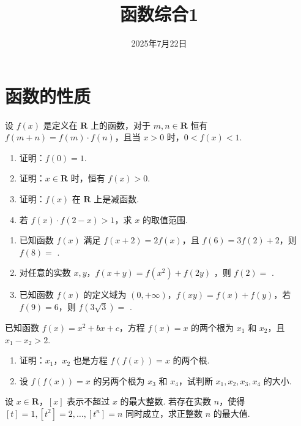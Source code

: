 \documentclass[a4paper , final]{ctexart}
\title{函数综合1}
\date{2025年7月22日}
\newenvironment{problem}[1]{%
  \item #1
  \par
  \vspace{8cm}
}{}
\begin{document}
\maketitle

\section*{函数的性质}

\begin{problems}
    \begin{problem}
    {
    设 $ f(x)$ 是定义在 $ \mathbf{R}$ 上的函数，对于 $m,n\in \mathbf{R}$ 恒有 $ f(m+n) = f(m) \cdot f(n)$，且当 $ x>0$ 时，$ 0<f(x)<1$.
    \begin{enumerate}[label=(\arabic*)]
        \item 证明：$ f(0) = 1$.
        \item 证明：$ x\in\mathbf{R}$ 时，恒有 $ f(x) >0$.
        \item 证明：$ f(x)$ 在 $ \mathbf{R}$ 上是减函数.
        \item 若 $f(x)\cdot f(2-x)>1$，求 $ x$ 的取值范围.
    \end{enumerate}
    }
    \end{problem}

    \begin{problem}
    {
    \begin{enumerate}[label=(\arabic*)]
        \item 已知函数 $ f(x)$ 满足 $f(x+2) = 2f(x)$，且 $f(6) = 3f(2)+2$，则 $f(8)=$ \underline{\hspace{1.5cm}}.
        \item 对任意的实数 $x,y$，$f(x+y)=f(x^2)+f(2y)$ ，则 $f(2)=$ \underline{\hspace{1.5cm}}.
        \item 已知函数 $ f(x)$ 的定义域为 $ (0,+\infty)$，$f(xy)=f(x)+f(y)$，若 $f(9)=6$，则 $f(3\sqrt{3})=$ \underline{\hspace{1.5cm}}.
    \end{enumerate}
    }
    \end{problem}

    \begin{problem}
    {
    已知函数 $ f(x) = x^2 +bx +c$，方程 $ f(x) = x$ 的两个根为 $ x_1$ 和 $ x_2$，且 $ x_1-x_2>2$.
    \begin{enumerate}[label=(\arabic*)]
        \item 证明：$ x_1$，$ x_2$ 也是方程 $ f(f(x)) =x$ 的两个根.
        \item 设 $ f(f(x)) = x$ 的另两个根为 $ x_3$ 和 $ x_4$，试判断 $ x_1, x_2, x_3, x_4$ 的大小.
    \end{enumerate}
    }
    \end{problem}

    \begin{problem}
    {
    设 $x\in \mathbf{R}$，$[x]$ 表示不超过 $ x$ 的最大整数. 若存在实数 $ n$，使得$ [t] = 1 , [t^2] = 2 , \ldots , [t^n] = n$ 同时成立，求正整数 $ n$ 的最大值.
    }
    \end{problem}

\end{problems}
\end{document}
